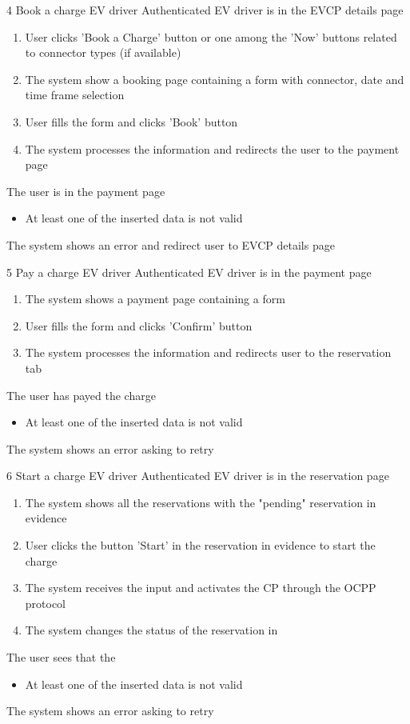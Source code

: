 \usecase
{4}
{Book a charge}
{EV driver}
{Authenticated EV driver is in the EVCP details page}
{
    \begin{enumerate}
        \item User clicks 'Book a Charge' button or one among the 'Now' buttons related to connector types (if available)
        \item The system show a booking page containing a form with connector, date and time frame selection
        \item User fills the form and clicks 'Book' button
        \item The system processes the information and redirects the user to the payment page
    \end{enumerate}
}
{The user is in the payment page}
{
    \begin{itemize}
        \item At least one of the inserted data is not valid
    \end{itemize}
}
{
    The system shows an error and redirect user to EVCP details page
}

\usecase
{5}
{Pay a charge}
{EV driver}
{Authenticated EV driver is in the payment page}
{
    \begin{enumerate}
        \item The system shows a payment page containing a form
        \item User fills the form and clicks 'Confirm' button
        \item The system processes the information and redirects user to the reservation tab
    \end{enumerate}
}
{The user has payed the charge}
{
    \begin{itemize}
        \item At least one of the inserted data is not valid
    \end{itemize}
}
{
    The system shows an error asking to retry
}

\usecase
{6}
{Start a charge}
{EV driver}
{Authenticated EV driver is in the reservation page}
{
    \begin{enumerate}
        \item The system shows all the reservations with the "pending" reservation in evidence
        \item User clicks the button 'Start' in the reservation in evidence to start the charge
        \item The system receives the input and activates the CP through the OCPP protocol
        \item The system changes the status of the reservation in
    \end{enumerate}
}
{The user sees that the }
{
    \begin{itemize}
        \item At least one of the inserted data is not valid
    \end{itemize}
}
{
    The system shows an error asking to retry
}

